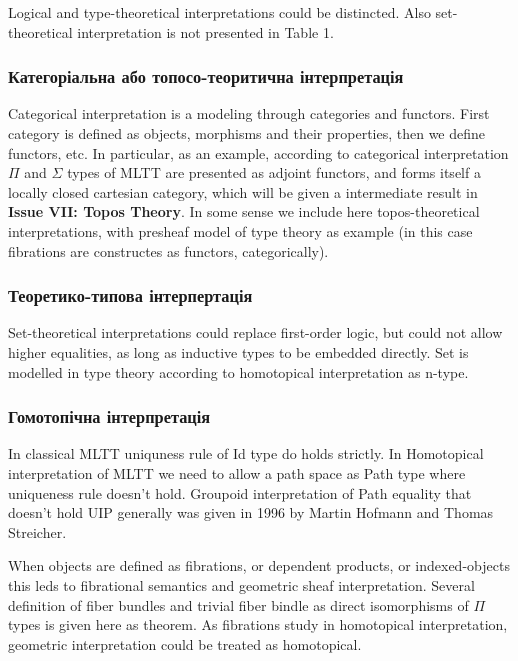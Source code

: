 Logical and type-theoretical interpretations could be distincted. Also
set-theoretical interpretation is not presented in Table 1.


\subsubsection*{Категоріальна або топосо-теоритична інтерпретація}

Categorical interpretation is a modeling through categories and functors.
First category is defined as objects, morphisms and their properties, then
we define functors, etc. In particular, as an example, according to categorical
interpretation $\Pi$ and $\Sigma$ types of MLTT are presented as adjoint
functors, and forms itself a locally closed cartesian category, which will be given a
intermediate result in \textbf{Issue VII: Topos Theory}. In some sense we include here
topos-theoretical interpretations, with presheaf model of type theory as
example (in this case fibrations are constructes as functors, categorically).

\subsubsection*{Теоретико-типова інтерпертація}

Set-theoretical interpretations could replace first-order logic, but could not allow
higher equalities, as long as inductive types to be embedded directly. Set is modelled
in type theory according to homotopical interpretation as n-type.

\newpage
\subsubsection*{Гомотопічна інтерпретація}

In classical MLTT uniquness rule of Id type do holds strictly. In Homotopical
interpretation of MLTT we need to allow a path space as Path type where uniqueness
rule doesn't hold. Groupoid interpretation of Path equality that doesn't hold UIP generally
was given in 1996 by Martin Hofmann and Thomas Streicher.

When objects are defined as fibrations, or dependent products, or indexed-objects
this leds to fibrational semantics and geometric sheaf interpretation. Several definition
of fiber bundles and trivial fiber bindle as direct isomorphisms of $\Pi$ types is
given here as theorem. As fibrations study in homotopical interpretation, geometric
interpretation could be treated as homotopical.



